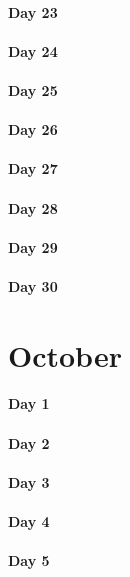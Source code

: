 \documentclass[UTF8,a4paper,8pt]{ctexart}
\begin{document}
 	 \paragraph{Day 23      \quad     }
 	 \paragraph{Day 24      \quad     }
 	 \paragraph{Day 25      \quad     }
 	 \paragraph{Day 26      \quad     }
 	 \paragraph{Day 27      \quad     }
 	 \paragraph{Day 28      \quad     }
 	 \paragraph{Day 29      \quad     }   
 	 \paragraph{Day 30      \quad     }
\section{October}
 	 \paragraph{Day 1       \quad     }
 	 \paragraph{Day 2       \quad     }
 	 \paragraph{Day 3       \quad     }
 	 \paragraph{Day 4       \quad     }
 	 \paragraph{Day 5       \quad     }
\end{document}

